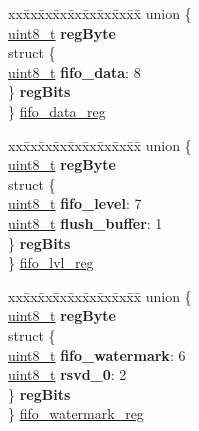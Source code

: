 \begin{DoxyCompactItemize}
\begin{tabbing}
\end{tabbing}\item 
\begin{tabbing}
xx\=xx\=xx\=xx\=xx\=xx\=xx\=xx\=xx\=\kill
union \{\\
\>\hyperlink{vl53l0x__types_8h_aba7bc1797add20fe3efdf37ced1182c5}{uint8\_t} {\bfseries regByte}\\
\>struct \{\\
\>\>\hyperlink{vl53l0x__types_8h_aba7bc1797add20fe3efdf37ced1182c5}{uint8\_t} {\bfseries fifo\_data}: 8\\
\>\} {\bfseries regBits}\\
\} \hyperlink{structstruct_a0c4836d627c24316e95a54b24bc569a9}{fifo\_data\_reg}\\

\end{tabbing}\item 
\begin{tabbing}
xx\=xx\=xx\=xx\=xx\=xx\=xx\=xx\=xx\=\kill
union \{\\
\>\hyperlink{vl53l0x__types_8h_aba7bc1797add20fe3efdf37ced1182c5}{uint8\_t} {\bfseries regByte}\\
\>struct \{\\
\>\>\hyperlink{vl53l0x__types_8h_aba7bc1797add20fe3efdf37ced1182c5}{uint8\_t} {\bfseries fifo\_level}: 7\\
\>\>\hyperlink{vl53l0x__types_8h_aba7bc1797add20fe3efdf37ced1182c5}{uint8\_t} {\bfseries flush\_buffer}: 1\\
\>\} {\bfseries regBits}\\
\} \hyperlink{structstruct_a8d30208f95a8160e46c989f5bcb6d770}{fifo\_lvl\_reg}\\

\end{tabbing}\item 
\begin{tabbing}
xx\=xx\=xx\=xx\=xx\=xx\=xx\=xx\=xx\=\kill
union \{\\
\>\hyperlink{vl53l0x__types_8h_aba7bc1797add20fe3efdf37ced1182c5}{uint8\_t} {\bfseries regByte}\\
\>struct \{\\
\>\>\hyperlink{vl53l0x__types_8h_aba7bc1797add20fe3efdf37ced1182c5}{uint8\_t} {\bfseries fifo\_watermark}: 6\\
\>\>\hyperlink{vl53l0x__types_8h_aba7bc1797add20fe3efdf37ced1182c5}{uint8\_t} {\bfseries rsvd\_0}: 2\\
\>\} {\bfseries regBits}\\
\} \hyperlink{structstruct_a9d47568f82f8554a6869d7e026ff9382}{fifo\_watermark\_reg}\\


\end{tabbing}
\end{DoxyCompactItemize}
